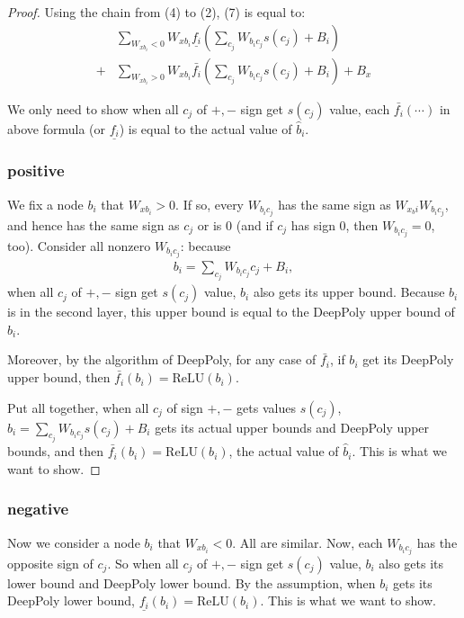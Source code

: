 \documentclass[]{article}
\theoremstyle{definition}
\newcommand{\ReLU}{\mathrm{ReLU}}
\begin{document}
\begin{proof}
Using the chain from (4) to (2), (7) is equal to: \begin{align*}
&\sum_{W_{xb_i}<0}W_{xb_i}\underline{f_i}(\sum_{c_j}W_{b_ic_j}s(c_j)+B_i)\\
+&\sum_{W_{xb_i}>0}W_{xb_i}\bar{f_i}(\sum_{c_j}W_{b_ic_j}s(c_j)+B_i)+B_x
\end{align*} 

We only need to show when all $c_j$ of $+,-$ sign get $s(c_j)$ value, each $\bar{f_i}(\cdots)$ in above formula (or $\underline{f_i}$) is equal to the actual value of $\hat{b}_i$. 

\subsubsection*{positive} We fix a node $b_i$ that $W_{xb_i}>0$. If so, every $W_{b_ic_j}$ has the same sign as $W_{x_bi}W_{b_ic_j}$, and hence has the same sign as $c_j$ or is $0$ (and if $c_j$ has sign $0$, then $W_{b_ic_j}=0$, too). Consider all nonzero $W_{b_ic_j}$: because \begin{align}
	b_i = \sum_{c_j} W_{b_ic_j}c_j+B_i,
\end{align}  when all $c_j$ of $+,-$ sign get $s(c_j)$ value, $b_i$ also gets its upper bound. Because $b_i$ is in the second layer, this upper bound is equal to the DeepPoly upper bound of $b_i$. 


Moreover, by the algorithm of DeepPoly, for any case of $\bar{f_i}$, if $b_i$ get its DeepPoly upper bound, then $\bar{f_i}(b_i)=\ReLU(b_i)$. 

Put all together, when all $c_j$ of sign $+,-$ gets values $s(c_j)$, $b_i=\sum_{c_j}W_{b_ic_j}s(c_j)+B_i$ gets its actual upper bounds and DeepPoly upper bounds, and then  $\bar{f_i}(b_i)=\ReLU(b_i)$, the actual value of $\hat{b}_i$. This is what we want to show.
\end{proof}



\subsubsection*{negative}Now we consider a node $b_i$ that $W_{xb_i}<0$. All are similar. Now, each $W_{b_ic_j}$ has the opposite sign of $c_j$. So when all $c_j$ of $+,-$ sign get $s(c_j)$ value, $b_i$ also gets its lower bound and DeepPoly lower bound. By the assumption, when $b_i$ gets its DeepPoly lower bound, $\underline{f_i}(b_i)=\ReLU(b_i)$. This is what we want to show.
\end{document}
